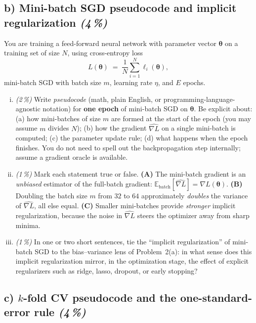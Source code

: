 \documentclass[11pt,a4paper]{article}
\newcommand{\subpoints}[1]{\textit{(#1\,\%)}}
\begin{document}
\subsection*{b) Mini-batch SGD pseudocode and implicit regularization \subpoints{4}}

You are training a feed-forward neural network with parameter vector $\boldsymbol\theta$ on a training set of size $N$, using cross-entropy loss
$$L(\boldsymbol\theta) \;=\; \frac{1}{N} \sum_{i=1}^N \ell_i(\boldsymbol\theta),$$
mini-batch SGD with batch size $m$, learning rate $\eta$, and $E$ epochs.

\begin{enumerate}[(i)]
  \item \subpoints{2} Write \emph{pseudocode} (math, plain English, or programming-language-agnostic notation) for \textbf{one epoch} of mini-batch SGD on $\boldsymbol\theta$. Be explicit about: (a) how mini-batches of size $m$ are formed at the start of the epoch (you may assume $m$ divides $N$); (b) how the gradient $\widehat{\nabla L}$ on a single mini-batch is computed; (c) the parameter update rule; (d) what happens when the epoch finishes. You do not need to spell out the backpropagation step internally; assume a gradient oracle is available.

  \item \subpoints{1} Mark each statement true or false. \textbf{(A)} The mini-batch gradient is an \emph{unbiased} estimator of the full-batch gradient: $\mathbb{E}_{\text{batch}}[\widehat{\nabla L}] = \nabla L(\boldsymbol\theta)$. \textbf{(B)} Doubling the batch size $m$ from $32$ to $64$ approximately \emph{doubles} the variance of $\widehat{\nabla L}$, all else equal. \textbf{(C)} Smaller mini-batches provide \emph{stronger} implicit regularization, because the noise in $\widehat{\nabla L}$ steers the optimizer away from sharp minima.

  \item \subpoints{1} In one or two short sentences, tie the ``implicit regularization'' of mini-batch SGD to the bias--variance lens of Problem~2(a): in what sense does this implicit regularization mirror, in the optimization stage, the effect of explicit regularizers such as ridge, lasso, dropout, or early stopping?
\end{enumerate}

\subsection*{c) $k$-fold CV pseudocode and the one-standard-error rule \subpoints{4}}
\end{document}
